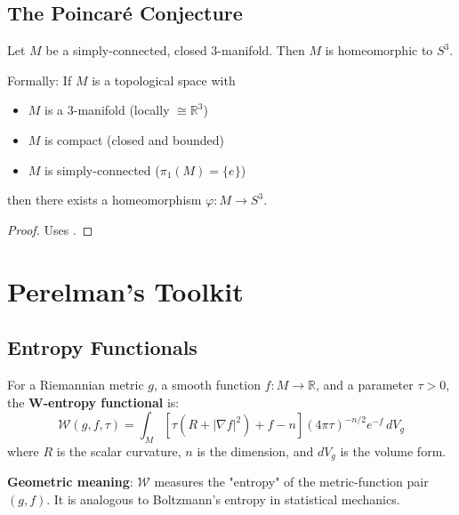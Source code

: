 \section{The Poincaré Conjecture}

\begin{theorem}
\label{thm:poincare_conjecture}
Let $M$ be a simply-connected, closed 3-manifold. Then $M$ is homeomorphic to $S^3$.

Formally: If $M$ is a topological space with
\begin{itemize}
\item $M$ is a 3-manifold (locally $\cong \mathbb{R}^3$)
\item $M$ is compact (closed and bounded)
\item $M$ is simply-connected ($\pi_1(M) = \{e\}$)
\end{itemize}
then there exists a homeomorphism $\varphi : M \to S^3$.
\end{theorem}

\begin{proof}
Uses .
\end{proof}

\chapter{Perelman's Toolkit}
\label{chap:perelman_toolkit}

\section{Entropy Functionals}

\begin{definition}[W-Entropy]
\label{def:w_entropy}
For a Riemannian metric $g$, a smooth function $f : M \to \mathbb{R}$, and a parameter $\tau > 0$, the \textbf{W-entropy functional} is:
\[
\mathcal{W}(g, f, \tau) = \int_M \left[\tau(R + |\nabla f|^2) + f - n\right] (4\pi\tau)^{-n/2} e^{-f} \, dV_g
\]
where $R$ is the scalar curvature, $n$ is the dimension, and $dV_g$ is the volume form.

\textbf{Geometric meaning}: $\mathcal{W}$ measures the "entropy" of the metric-function pair $(g, f)$. It is analogous to Boltzmann's entropy in statistical mechanics.
\end{definition}

